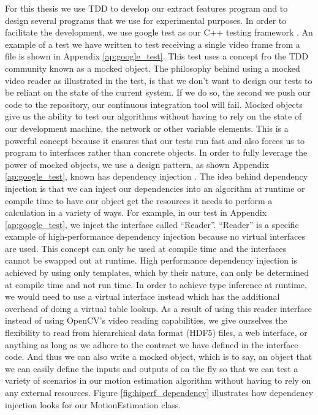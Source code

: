 For this thesis we use TDD to develop our extract features program and to design
several programs that we use for experimental purposes. In order to facilitate
the development, we use google test as our C++ testing framework
\cite{googletest}. An example of a test we have written to test receiving a
single video frame from a file is shown in Appendix \ref{ap:google_test}. This
test uses a concept fro the TDD community known as a mocked object. The
philosophy behind using a mocked video reader as illustrated in the test, is
that we don't want to design our tests to be reliant on the state of the current
system. If we do so, the second we push our code to the repository, our
continuous integration tool will fail. Mocked objects give us the ability to
test our algorithms without having to rely on the state of our development
machine, the network or other variable elements. This is a powerful concept
because it ensures that our tests run fast and also forces us to program to
interfaces rather than concrete objects. In order to fully leverage the power of
mocked objects, we use a design pattern, as shown Appendix \ref{ap:google_test},
known has dependency injection \cite{gamma1995design}. The idea behind
dependency injection is that we can inject our dependencies into an algorithm at
runtime or compile time to have our object get the resources it needs to perform
a calculation in a variety of ways. For example, in our test in Appendix
\ref{ap:google_test}, we inject the interface called ``Reader''. ``Reader'' is a
specific example of high-performance dependency injection because no virtual
interfaces are used. This concept can only be used at compile time and the
interfaces cannot be swapped out at runtime. High performance dependency
injection is achieved by using only templates, which by their nature, can only
be determined at compile time and not run time. In order to achieve type
inference at runtime, we would need to use a virtual interface instead which has
the additional overhead of doing a virtual table lookup. As a result of using
this reader interface instead of using OpenCV's video reading capabilities, we
give ourselves the flexibility to read from hierarchical data format (HDF5)
files, a web interface, or anything as long as we adhere to the contract we have
defined in the interface code. And thus we can also write a mocked object, which
is to say, an object that we can easily define the inputs and outputs of on the
fly so that we can test a variety of scenarios in our motion estimation
algorithm without having to rely on any external resources. Figure \ref{fig:hiperf_dependency}
illustrates how dependency injection looks for our MotionEstimation class.

